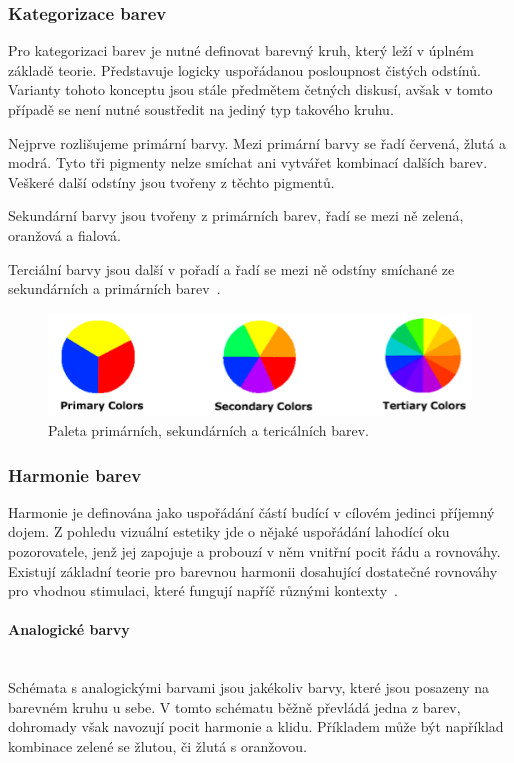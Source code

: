 \subsubsection{Kategorizace barev}
Pro kategorizaci barev je nutné definovat barevný kruh, který leží v úplném základě teorie. Představuje logicky uspořádanou posloupnost čistých odstínů. Varianty tohoto konceptu jsou stále předmětem četných diskusí, avšak v tomto případě
se není nutné soustředit na jediný typ takového kruhu.

Nejprve rozlišujeme primární barvy. Mezi primární barvy se řadí červená, žlutá a modrá. Tyto tři pigmenty nelze smíchat ani vytvářet kombinací dalších barev. Veškeré
další odstíny jsou tvořeny z těchto pigmentů.

Sekundární barvy jsou tvořeny z primárních barev, řadí se mezi ně zelená, oranžová a fialová.

Terciální barvy jsou další v pořadí a řadí se mezi ně odstíny smíchané ze sekundárních a primárních barev~\cite{colormatters_basic_color_theory}.

\begin{figure}[!ht]
    \centering
    \includegraphics[width=0.8\linewidth]{images/categories.png}
    \caption{Paleta primárních, sekundárních a tericálních barev.~\cite{colormatters_basic_color_theory}}
    \label{fig:Kategorie}
\end{figure}


\subsubsection{Harmonie barev}
Harmonie je definována jako uspořádání částí budící v cílovém jedinci příjemný dojem. Z pohledu vizuální estetiky jde o nějaké uspořádání lahodící oku pozorovatele, 
jenž jej zapojuje a probouzí v něm vnitřní pocit řádu a rovnováhy. Existují základní teorie pro barevnou harmonii dosahující dostatečné rovnováhy pro
vhodnou stimulaci, které fungují napříč různými kontexty~\cite{colormatters_basic_color_theory}.

\paragraph{Analogické barvy}\mbox{}\\
Schémata s analogickými barvami jsou jakékoliv barvy, které jsou posazeny na barevném kruhu u sebe. V tomto schématu běžně převládá jedna z barev, dohromady však
navozují pocit harmonie a klidu. Příkladem může být například kombinace zelené se žlutou, či žlutá s oranžovou.


